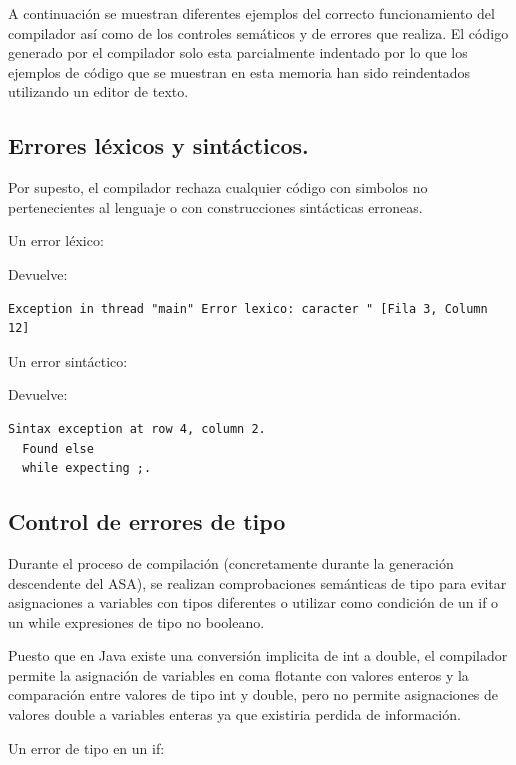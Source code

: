 \documentclass[11pt]{article}
\begin{document}
A continuación se muestran diferentes ejemplos del correcto funcionamiento del compilador así como de los controles semáticos y de errores que realiza.
El código generado por el compilador solo esta parcialmente indentado por lo que los ejemplos de código que se muestran en esta memoria han
sido reindentados utilizando un editor de texto.

\subsection{Errores léxicos y sintácticos.}
Por supesto, el compilador rechaza cualquier código con simbolos no pertenecientes al lenguaje o con construcciones sintácticas erroneas.

Un error léxico:



Devuelve:

\begin{lstlisting}
Exception in thread "main" Error lexico: caracter " [Fila 3, Column 12]
\end{lstlisting}

Un error sintáctico:



Devuelve:

\begin{lstlisting}
Sintax exception at row 4, column 2.
  Found else
  while expecting ;.
\end{lstlisting}



\subsection{Control de errores de tipo}
Durante el proceso de compilación (concretamente durante la generación descendente del ASA), se realizan comprobaciones
semánticas de tipo para evitar asignaciones a variables con tipos diferentes o utilizar como condición de un if o un while
expresiones de tipo no booleano.

Puesto que en Java existe una conversión implicita de int a double, el compilador permite la asignación de variables en coma
 flotante con valores enteros y la comparación entre valores de tipo int y double, pero no permite asignaciones de valores
 double a variables enteras ya que existiria perdida de información.


Un error de tipo en un if:

\end{document}
